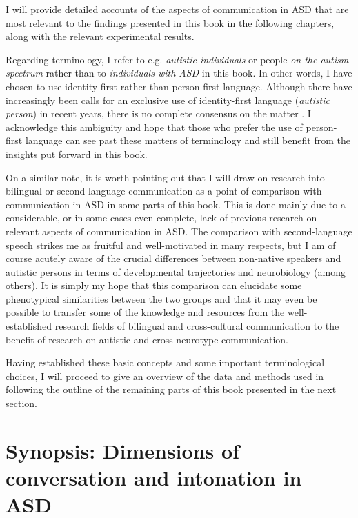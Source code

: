 I will provide detailed accounts of the aspects of communication in ASD that are most relevant to the findings presented in this book in the following chapters, along with the relevant experimental results.

Regarding terminology, I refer to e.g. \emph{autistic individuals} or people \emph{on the autism spectrum} rather than to \emph{individuals with ASD} in this book. In other words, I have chosen to use identity-first rather than person-first language. Although there have increasingly been calls for an exclusive use of identity-first language (\emph{autistic person}) in recent years, there is no complete consensus on the matter \citep{bothaDoesLanguageMatter2021,bottema-beutelAvoidingAbleistLanguage2021,dunnPersonfirstIdentityfirstLanguage2015,gernsbacherEditorialPerspectiveUse2017,vivantiAskEditorWhat2020,tepestMeaningDiagnosisDifferent2021}. I acknowledge this ambiguity and hope that those who prefer the use of person-first language can see past these matters of terminology and still benefit from the insights put forward in this book.

On a similar note, it is worth pointing out that I will draw on research into bilingual or second-language communication as a point of comparison with communication in ASD in some parts of this book. This is done mainly due to a considerable, or in some cases even complete, lack of previous research on relevant aspects of communication in ASD. The comparison with second-language speech strikes me as fruitful and well-motivated in many respects, but I am of course acutely aware of the crucial differences between non-native speakers and autistic persons in terms of developmental trajectories and neurobiology (among others). It is simply my hope that this comparison can elucidate some phenotypical similarities between the two groups and that it may even be possible to transfer some of the knowledge and resources from the well-established research fields of bilingual and cross-cultural communication to the benefit of research on autistic and cross-neurotype communication.

Having established these basic concepts and some important terminological choices, I will proceed to give an overview of the data and methods used in  following the outline of the remaining parts of this book presented in the next section.

\section{Synopsis: Dimensions of conversation and intonation in ASD}\label{synopsis}
	
